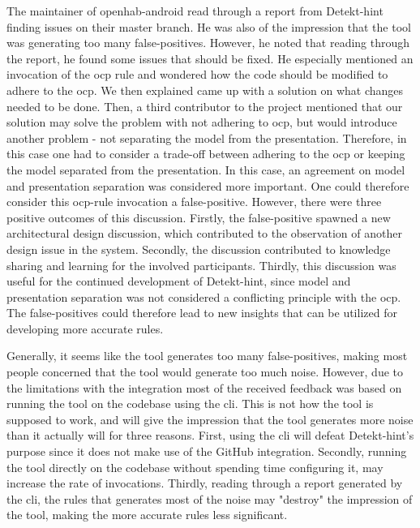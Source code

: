 \documentclass{report}
\begin{document}
The maintainer of openhab-android\cite{openhab} read through a report from Detekt-hint finding issues on their master branch. He was also of the impression that the tool was generating too many false-positives. However, he noted that reading through the report, he found some issues that should be fixed. He especially mentioned an invocation of the \gls{ocp} rule and wondered how the code should be modified to adhere to the \gls{ocp}. We then explained came up with a solution on what changes needed to be done. Then, a third contributor to the project mentioned that our solution may solve the problem with not adhering to \gls{ocp}, but would introduce another problem - not separating the model from the presentation. Therefore, in this case one had to consider a trade-off between adhering to the \gls{ocp} or keeping the model separated from the presentation. In this case, an agreement on model and presentation separation was considered more important. One could therefore consider this \gls{ocp}-rule invocation a false-positive.  However, there were three positive outcomes of this discussion. Firstly, the false-positive spawned a new architectural design discussion, which contributed to the observation of another design issue in the system. Secondly, the discussion contributed to knowledge sharing and learning for the involved participants.
Thirdly, this discussion was useful for the continued development of Detekt-hint, since model and presentation separation was not considered a conflicting principle with the \gls{ocp}. The false-positives could therefore lead to new insights that can be utilized for developing more accurate rules. 

Generally, it seems like the tool generates too many false-positives, making most people concerned that the tool would generate too much noise. However, due to the limitations with the integration most of the received feedback was based on running the tool on the codebase using the \gls{cli}. This is not how the tool is supposed to work, and will give the impression that the tool generates more noise than it actually will for three reasons. First, using the \gls{cli} will defeat Detekt-hint's  purpose since it does not make use of the GitHub integration. Secondly, running the tool directly on the codebase without spending time configuring it, may increase the rate of invocations. Thirdly, reading through a report generated by the \gls{cli}, the rules that generates most of the noise may "destroy" the impression of the tool, making the more accurate rules less significant. 
\end{document}
